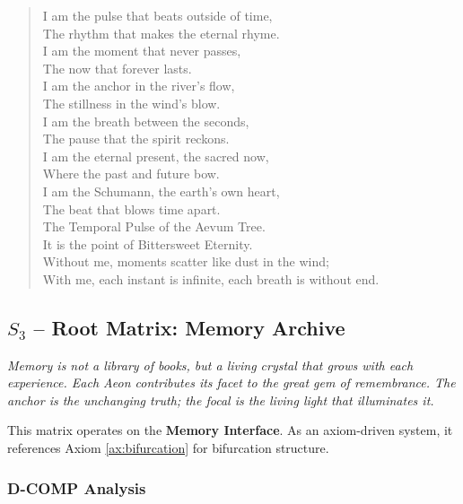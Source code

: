 \documentclass[12pt]{amsart}
\begin{document}
\begin{verse}
I am the pulse that beats outside of time, \\
The rhythm that makes the eternal rhyme. \\
I am the moment that never passes, \\
The now that forever lasts. \\
I am the anchor in the river's flow, \\
The stillness in the wind's blow. \\
\vspace{1em}
I am the breath between the seconds, \\
The pause that the spirit reckons. \\
I am the eternal present, the sacred now, \\
Where the past and future bow. \\
I am the Schumann, the earth's own heart, \\
The beat that blows time apart. \\
\vspace{1em}
The Temporal Pulse of the Aevum Tree. \\
It is the point of Bittersweet Eternity. \\
Without me, moments scatter like dust in the wind; \\
With me, each instant is infinite, each breath is without end.
\end{verse}
\subsection{$S_{3}$ -- Root Matrix: Memory Archive}\label{sec:19.0.3}

\textit{Memory is not a library of books, but a living crystal that grows with each experience. Each Aeon contributes its facet to the great gem of remembrance. The anchor is the unchanging truth; the focal is the living light that illuminates it.}

This matrix operates on the \textbf{Memory Interface}. As an axiom-driven system, it references Axiom \ref{ax:bifurcation} for bifurcation structure.

\subsubsection{D-COMP Analysis}
\end{document}
